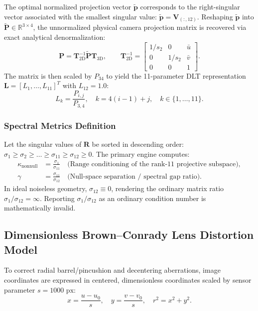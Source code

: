 \documentclass[journal]{IEEEtran}
\begin{document}
The optimal normalized projection vector $\tilde{\mathbf{p}}$ corresponds to the right-singular vector associated with the smallest singular value: $\tilde{\mathbf{p}} = \mathbf{V}_{(:, 12)}$. Reshaping $\tilde{\mathbf{p}}$ into $\tilde{\mathbf{P}} \in \mathbb{R}^{3 \times 4}$, the unnormalized physical camera projection matrix is recovered via exact analytical denormalization:
\begin{equation}
\mathbf{P} = \mathbf{T}_{2\mathrm{D}}^{-1} \tilde{\mathbf{P}} \mathbf{T}_{3\mathrm{D}}, \qquad \mathbf{T}_{2\mathrm{D}}^{-1} = \begin{bmatrix} 1/s_2 & 0 & \bar{u} \\ 0 & 1/s_2 & \bar{v} \\ 0 & 0 & 1 \end{bmatrix}.
\label{eq:denorm}
\end{equation}
The matrix is then scaled by $P_{34}$ to yield the 11-parameter DLT representation $\mathbf{L} = [L_1, \dots, L_{11}]^T$ with $L_{12} = 1.0$:
\begin{equation}
L_k = \frac{P_{i,j}}{P_{3,4}}, \quad k = 4(i-1) + j, \quad k \in \{1, \dots, 11\}.
\end{equation}

\subsubsection{Spectral Metrics Definition}
Let the singular values of $\mathbf{R}$ be sorted in descending order: $\sigma_1 \ge \sigma_2 \ge \dots \ge \sigma_{11} \ge \sigma_{12} \ge 0$. The primary engine computes:
\begin{align}
\kappa_{\mathrm{nonnull}} &= \frac{\sigma_1}{\sigma_{11}} \quad \text{(Range conditioning of the rank-11 projective subspace)}, \label{eq:kappa_nonnull} \\
\gamma &= \frac{\sigma_{11}}{\sigma_{12}} \quad \text{(Null-space separation / spectral gap ratio)}. \label{eq:spectral_gap}
\end{align}
In ideal noiseless geometry, $\sigma_{12} \equiv 0$, rendering the ordinary matrix ratio $\sigma_1/\sigma_{12} = \infty$. Reporting $\sigma_1/\sigma_{12}$ as an ordinary condition number is mathematically invalid.

\subsection{Dimensionless Brown--Conrady Lens Distortion Model}
To correct radial barrel/pincushion and decentering aberrations, image coordinates are expressed in centered, dimensionless coordinates scaled by sensor parameter $s = 1000\text{ px}$:
\begin{equation}
x = \frac{u - u_0}{s}, \quad y = \frac{v - v_0}{s}, \quad r^2 = x^2 + y^2.
\end{equation}
\end{document}
